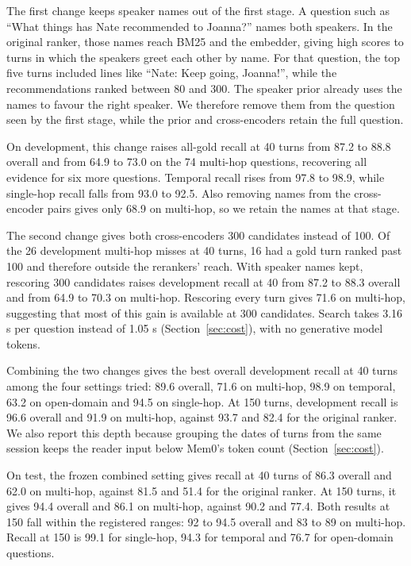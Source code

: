 The first change keeps speaker names out of the first stage. A question such as ``What things has Nate recommended to Joanna?'' names both speakers. In the original ranker, those names reach BM25 and the embedder, giving high scores to turns in which the speakers greet each other by name. For that question, the top five turns included lines like ``Nate: Keep going, Joanna!'', while the recommendations ranked between 80 and 300. The speaker prior already uses the names to favour the right speaker. We therefore remove them from the question seen by the first stage, while the prior and cross-encoders retain the full question.

On development, this change raises all-gold recall at 40 turns from 87.2 to 88.8 overall and from 64.9 to 73.0 on the 74 multi-hop questions, recovering all evidence for six more questions. Temporal recall rises from 97.8 to 98.9, while single-hop recall falls from 93.0 to 92.5. Also removing names from the cross-encoder pairs gives only 68.9 on multi-hop, so we retain the names at that stage.

The second change gives both cross-encoders 300 candidates instead of 100. Of the 26 development multi-hop misses at 40 turns, 16 had a gold turn ranked past 100 and therefore outside the rerankers' reach. With speaker names kept, rescoring 300 candidates raises development recall at 40 from 87.2 to 88.3 overall and from 64.9 to 70.3 on multi-hop. Rescoring every turn gives 71.6 on multi-hop, suggesting that most of this gain is available at 300 candidates. Search takes 3.16 s per question instead of 1.05 s (Section~\ref{sec:cost}), with no generative model tokens.

Combining the two changes gives the best overall development recall at 40 turns among the four settings tried: 89.6 overall, 71.6 on multi-hop, 98.9 on temporal, 63.2 on open-domain and 94.5 on single-hop. At 150 turns, development recall is 96.6 overall and 91.9 on multi-hop, against 93.7 and 82.4 for the original ranker. We also report this depth because grouping the dates of turns from the same session keeps the reader input below Mem0's token count (Section~\ref{sec:cost}).

On test, the frozen combined setting gives recall at 40 turns of 86.3 overall and 62.0 on multi-hop, against 81.5 and 51.4 for the original ranker. At 150 turns, it gives 94.4 overall and 86.1 on multi-hop, against 90.2 and 77.4. Both results at 150 fall within the registered ranges: 92 to 94.5 overall and 83 to 89 on multi-hop. Recall at 150 is 99.1 for single-hop, 94.3 for temporal and 76.7 for open-domain questions.

